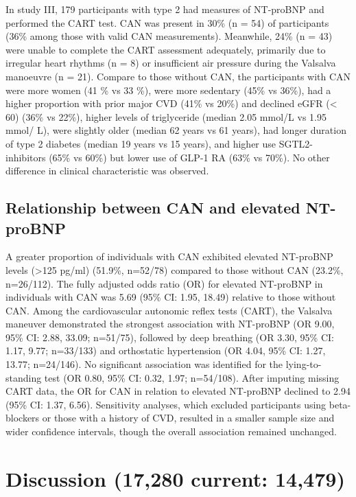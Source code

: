 \documentclass[
  a4paper,
  headsepline=true,
  open=any]{scrbook}
\begin{document}
In study III, 179 participants with type 2 had measures of NT-proBNP and
performed the CART test. CAN was present in 30\% (n = 54) of
participants (36\% among those with valid CAN measurements). Meanwhile,
24\% (n = 43) were unable to complete the CART assessment adequately,
primarily due to irregular heart rhythms (n = 8) or insufficient air
pressure during the Valsalva manoeuvre (n = 21). Compare to those
without CAN, the participants with CAN were more women (41 \% vs 33 \%),
were more sedentary (45\% vs 36\%), had a higher proportion with prior
major CVD (41\% vs 20\%) and declined eGFR (\textless{} 60) (36\% vs
22\%), higher levels of triglyceride (median 2.05 mmol/L vs 1.95 mmol/
L), were slightly older (median 62 years vs 61 years), had longer
duration of type 2 diabetes (median 19 years vs 15 years), and higher
use SGTL2-inhibitors (65\% vs 60\%) but lower use of GLP-1 RA (63\% vs
70\%). No other difference in clinical characteristic was observed.

\hypertarget{relationship-between-can-and-elevated-nt-probnp}{%
\section{Relationship between CAN and elevated
NT-proBNP}\label{relationship-between-can-and-elevated-nt-probnp}}

A greater proportion of individuals with CAN exhibited elevated
NT-proBNP levels (\textgreater125 pg/ml) (51.9\%, n=52/78) compared to
those without CAN (23.2\%, n=26/112). The fully adjusted odds ratio (OR)
for elevated NT-proBNP in individuals with CAN was 5.69 (95\% CI: 1.95,
18.49) relative to those without CAN. Among the cardiovascular autonomic
reflex tests (CART), the Valsalva maneuver demonstrated the strongest
association with NT-proBNP (OR 9.00, 95\% CI: 2.88, 33.09; n=51/75),
followed by deep breathing (OR 3.30, 95\% CI: 1.17, 9.77; n=33/133) and
orthostatic hypertension (OR 4.04, 95\% CI: 1.27, 13.77; n=24/146). No
significant association was identified for the lying-to-standing test
(OR 0.80, 95\% CI: 0.32, 1.97; n=54/108). After imputing missing CART
data, the OR for CAN in relation to elevated NT-proBNP declined to 2.94
(95\% CI: 1.37, 6.56). Sensitivity analyses, which excluded participants
using beta-blockers or those with a history of CVD, resulted in a
smaller sample size and wider confidence intervals, though the overall
association remained unchanged.


\hypertarget{discussion-17280-current-14479}{%
\chapter{Discussion (17,280 current:
14,479)}\label{discussion-17280-current-14479}}
\end{document}
